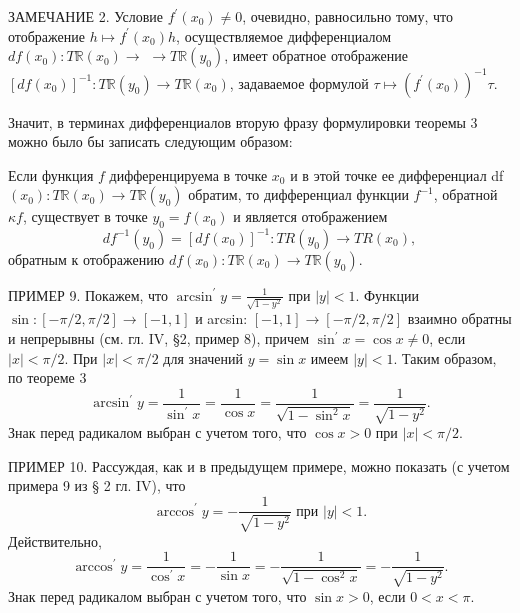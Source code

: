 \documentclass{article}
\begin{document}
ЗАМЕЧАНИЕ 2. Условие $f^{\prime}\left(x_0\right) \neq 0$, очевидно, равносильно тому, что отображение $h \mapsto f^{\prime}\left(x_0\right) h$, осуществляемое дифференциалом $d f\left(x_0\right): T \mathbb{R}\left(x_0\right) \rightarrow$ $\rightarrow T \mathbb{R}\left(y_0\right)$, имеет обратное отображение $\left[d f\left(x_0\right)\right]^{-1}: T \mathbb{R}\left(y_0\right) \rightarrow T \mathbb{R}\left(x_0\right)$, задаваемое формулой $\tau \mapsto\left(f^{\prime}\left(x_0\right)\right)^{-1} \tau$.

Значит, в терминах дифференциалов вторую фразу формулировки теоремы 3 можно было бы записать следующим образом:

Если функция $f$ дифференцируема в точке $x_0$ и в этой точке ее дифференциал df $\left(x_0\right): T \mathbb{R}\left(x_0\right) \rightarrow T \mathbb{R}\left(y_0\right)$ обратим, то дифференциал функции $f^{-1}$, обратной $\kappa f$, существует в точке $y_0=f\left(x_0\right)$ и является отображением
$$
d f^{-1}\left(y_0\right)=\left[d f\left(x_0\right)\right]^{-1}: T R\left(y_0\right) \rightarrow T R\left(x_0\right),
$$
обратным к отображению $d f\left(x_0\right): T \mathbb{R}\left(x_0\right) \rightarrow T \mathbb{R}\left(y_0\right)$.

ПРИМЕР 9. Покажем, что $\arcsin ^{\prime} y=\frac{1}{\sqrt{1-y^2}}$ при $|y|<1$.
Функции $\sin :[-\pi / 2, \pi / 2] \rightarrow[-1,1]$ и arcsin: $[-1,1] \rightarrow[-\pi / 2, \pi / 2]$ взаимно обратны и непрерывны (см. гл. IV, §2, пример 8), причем $\sin ^{\prime} x=\cos x \neq 0$, если $|x|<\pi / 2$. При $|x|<\pi / 2$ для значений $y=\sin x$ имеем $|y|<1$.
Таким образом, по теореме 3
$$
\arcsin ^{\prime} y=\frac{1}{\sin ^{\prime} x}=\frac{1}{\cos x}=\frac{1}{\sqrt{1-\sin ^2 x}}=\frac{1}{\sqrt{1-y^2}} .
$$
Знак перед радикалом выбран с учетом того, что $\cos x>0$ при $|x|<\pi / 2$.

ПРИМЕР 10. Рассуждая, как и в предыдущем примере, можно показать (с учетом примера 9 из § 2 гл. IV), что
$$
\arccos ^{\prime} y=-\frac{1}{\sqrt{1-y^2}} \text { при }|y|<1 .
$$
Действительно,
$$
\arccos ^{\prime} y=\frac{1}{\cos ^{\prime} x}=-\frac{1}{\sin x}=-\frac{1}{\sqrt{1-\cos ^2 x}}=-\frac{1}{\sqrt{1-y^2}} .
$$
Знак перед радикалом выбран с учетом того, что $\sin x>0$, если $0<x<\pi$.
\end{document}
